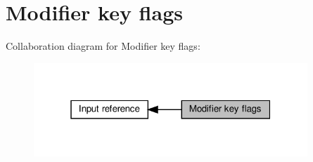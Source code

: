 \hypertarget{group__mods}{}\section{Modifier key flags}
\label{group__mods}
Collaboration diagram for Modifier key flags\+:
\nopagebreak
\begin{figure}[H]
\begin{center}
\leavevmode
\includegraphics[width=292pt]{group__mods}
\end{center}
\end{figure}
